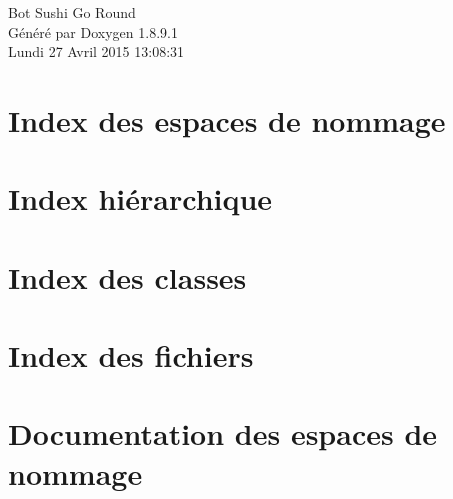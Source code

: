 \documentclass[twoside]{article}
\newcommand{\+}{\discretionary{\mbox{\scriptsize$\hookleftarrow$}}{}{}}
\begin{document}
\hypersetup{pageanchor=false,
             bookmarks=true,
             bookmarksnumbered=true,
             pdfencoding=unicode
            }
\begin{titlepage}
\vspace*{7cm}
\begin{center}%
{\Large Bot Sushi Go Round }\\
\vspace*{1cm}
{\large Généré par Doxygen 1.8.9.1}\\
\vspace*{0.5cm}
{\small Lundi 27 Avril 2015 13:08:31}\\
\end{center}
\end{titlepage}
\tableofcontents
{}
\hypersetup{pageanchor=true}

\section{Index des espaces de nommage}

\section{Index hiérarchique}

\section{Index des classes}

\section{Index des fichiers}

\section{Documentation des espaces de nommage}









\end{document}
